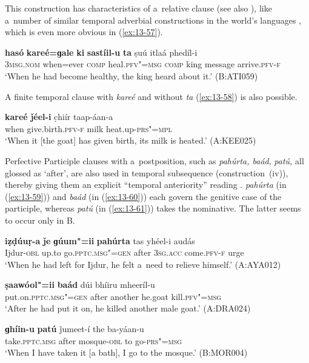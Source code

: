 This construction has characteristics of a~relative clause (see also ), like a~number of similar temporal adverbial constructions in the world's languages \citep[246--247]{thompsonetal2007}, which is even more obvious in (\ref{ex:13-57}).

\begin{exe}
\ex
\label{ex:13-57}
\gll \textbf{hasó} \textbf{kareé=ɡale} \textbf{ki} \textbf{sastíil-u} \textbf{ta} ṣuú itlaá phedíl-i\\
\textsc{3msg.nom} when=ever \textsc{comp} heal.\textsc{pfv"=msg} \textsc{comp} king message arrive.\textsc{pfv-f}\\
\glt `When he had become healthy, the king heard about it.' (B:ATI059) 
\end{exe}

A finite temporal clause with \textit{kareé} and without \textit{ta} (\ref{ex:13-58}) is also possible.

\begin{exe}
\ex
\label{ex:13-58}
\gll \textbf{kareé} \textbf{ǰéel-i} c̣hiír taap-áan-a \\
when give.birth.\textsc{pfv-f} milk heat.up-\textsc{prs"=mpl} \\
\glt `When it [the goat] has given birth, its milk is heated.' (A:KEE025) 
\end{exe}

Perfective Participle clauses with a~postposition, such as \textit{pahúrta, baád}, \textit{patú,} all glossed as `after', are also used in temporal subsequence (construction~(iv)), thereby giving them an explicit ``temporal anteriority'' reading \citep[159]{cristofaro2005}. \textit{pahúrta} (in (\ref{ex:13-59})) and \textit{baád} (in (\ref{ex:13-60})) each govern the genitive case of the participle, whereas \textit{patú} (in (\ref{ex:13-61})) takes the nominative. The latter seems to occur only in B. 

\begin{exe}
\ex
\label{ex:13-59}
\gll \textbf{iẓḍúuṛ-a} \textbf{ǰe} \textbf{ɡúum"=ii} \textbf{pahúrta} tas yhéel-i audás \\
Ijdur-\textsc{obl} up.to go.\textsc{pptc.msg"=gen} after \textsc{3sg.acc} come.\textsc{pfv-f} urge \\
\glt `When he had left for Ijdur, he felt a~need to relieve himself.' (A:AYA012)

\ex
\label{ex:13-60}
\gll \textbf{ṣaawóol"=ii} \textbf{baád} dúi bhíiru mheeríl-u \\
put.on.\textsc{pptc.msg"=gen} after another he.goat kill.\textsc{pfv"=msg}  \\
\glt `After he had put it on, he killed another male goat.' (A:DRA024)

\ex
\label{ex:13-61}
\gll \textbf{ɡhíin-u} \textbf{patú} ǰumeet-í the ba-yáan-u  \\
take.\textsc{pptc.msg} after mosque-\textsc{obl} to go-\textsc{prs"=msg} \\
\glt `When I have taken it [a bath], I go to the mosque.' (B:MOR004) 
\end{exe}

